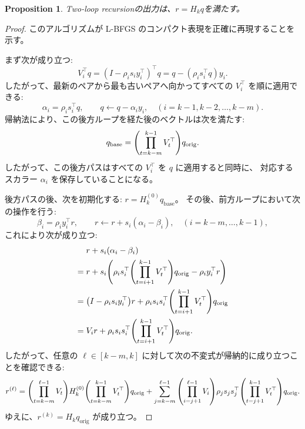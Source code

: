 \documentclass[a4paper, 10pt, dvipdfmx,draft]{article}
\newtheorem{proposition}{Proposition}
\begin{document}
\begin{proposition}
    Two-loop recursionの出力は、$r = H_k q$を満たす。
\end{proposition}
\begin{proof}
    このアルゴリズムが L-BFGS のコンパクト表現を正確に再現することを示す。

    まず次が成り立つ:
    \begin{equation*}
        V_i^\top q
        = (I - \rho_i s_i y_i^\top)^\top q
        = q - (\rho_i s_i^\top q) y_i.
    \end{equation*}
    したがって、最新のペアから最も古いペアへ向かってすべての \(V_i^\top\) を順に適用できる:
    \begin{equation*}
        \alpha_i = \rho_i s_i^\top q, \qquad
        q \gets q - \alpha_i y_i,
        \quad (i = k-1, k-2, \dots, k-m).
    \end{equation*}
    帰納法により、この後方ループを経た後のベクトルは次を満たす:
    \begin{equation*}
        q_{\mathrm{base}} =
        \qty(\prod_{t=k-m}^{k-1} V_t^\top) q_{\mathrm{orig}}.
    \end{equation*}
    したがって、この後方パスはすべての $V_i^\top$ を $q$ に適用すると同時に、
    対応するスカラー $\alpha_i$ を保存していることになる。

    後方パスの後、次を初期化する:
    $r = H_k^{(0)} q_{\mathrm{base}}$。
    その後、前方ループにおいて次の操作を行う:
    \begin{equation*}
        \beta_i = \rho_i y_i^\top r, \qquad
        r \gets r + s_i (\alpha_i - \beta_i),
        \quad (i = k-m, \dots, k-1),
    \end{equation*}
    これにより次が成り立つ:
    \begin{align*}
            & r+s_i (\alpha_i - \beta_i)                                                                                 \\
        ={} & r+ s_i \qty( \rho_i s_i^\top \qty(\prod_{t=i+1}^{k-1} V_t^\top) q_{\mathrm{orig}} - \rho_i y_i^\top r )    \\
        ={} & \qty(I - \rho_i s_i y_i^\top) r + \rho_i s_i s_i^\top \qty(\prod_{t=i+1}^{k-1} V_t^\top) q_{\mathrm{orig}} \\
        ={} & V_i r + \rho_i s_i s_i^\top \qty(\prod_{t=i+1}^{k-1} V_t^\top) q_{\mathrm{orig}}.
    \end{align*}
    したがって、任意の \(\ell \in [k-m, k]\) に対して次の不変式が帰納的に成り立つことを確認できる:
    \begin{equation*}
        r^{(\ell)} =
        \qty(\prod_{t=k-m}^{\ell-1} V_t)
        H_k^{(0)}
        \qty(\prod_{t=k-m}^{k-1} V_t^\top) q_{\mathrm{orig}}
        + \sum_{j=k-m}^{\ell-1}
        \qty(\prod_{i=j+1}^{\ell-1} V_i)
        \rho_j s_j s_j^\top
        \qty(\prod_{t=j+1}^{k-1} V_t^\top) q_{\mathrm{orig}}.
    \end{equation*}
    ゆえに、\(r^{(k)} = H_k q_{\mathrm{orig}}\) が成り立つ。
\end{proof}
\end{document}
